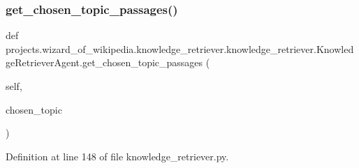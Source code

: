 \subsubsection{\texorpdfstring{get\+\_\+chosen\+\_\+topic\+\_\+passages()}{get\_chosen\_topic\_passages()}}
{\footnotesize\ttfamily def projects.\+wizard\+\_\+of\+\_\+wikipedia.\+knowledge\+\_\+retriever.\+knowledge\+\_\+retriever.\+Knowledge\+Retriever\+Agent.\+get\+\_\+chosen\+\_\+topic\+\_\+passages (\begin{DoxyParamCaption}\item[{}]{self,  }\item[{}]{chosen\+\_\+topic }\end{DoxyParamCaption})}



Definition at line 148 of file knowledge\+\_\+retriever.\+py.



